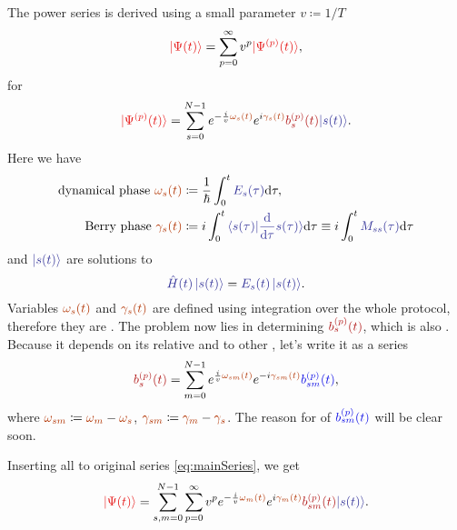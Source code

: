 The power series is derived using a small parameter $v\coloneqq 1/T$
\begin{equation}
    \red{\ket{\Psi(t)}}=\sum_{p=0}^\infty v^p \red{\ket{\Psi^{(p)}(t)}},
    \label{eq:mainSeries}
\end{equation}
for 
\begin{equation}
    \red{\ket{\Psi^{(p)}(t)}}=\sum_{s=0}^{N-1} e^{-\frac{i}{v} \reddd{\omega_s(t)}}e^{i\reddd{\gamma_s(t)}}\redd{b_s^{(p)}(t)}\bluee{\ket{s(t)}}.
\end{equation}
Here we have
\begin{align}
    \text{dynamical phase }\reddd{\omega_s(t)} &\coloneqq \frac{1}{\hbar}\int_0^t \bluee{E_s(\tau)}\d \tau,\\
    \text{Berry phase }\reddd{\gamma_s(t)} &\coloneqq i\int_0^t \bluee{\braket{s(\tau)|\frac{\d}{\d \tau}s(\tau)}}\d \tau \equiv i\int_0^t \bluee{M_{ss}(\tau)}\d \tau
    \label{eq:gammadef}
\end{align}
and $\bluee{\ket{s(t)}}$ are solutions to
\begin{equation}
    \bluee{\HH(t)\ket{s(t)}}=\bluee{E_s(t) \ket{s(t)}}.
\end{equation}
Variables $\reddd{\omega_s(t)}$ and $\reddd{\gamma_s(t)}$ are defined using integration over the whole protocol, therefore they are \emph{}.
The problem now lies in determining $\redd{b_s^{(p)}(t)}$, which is also . Because it depends on its relative  and  to other , let's write it as a series
\begin{equation}
    \redd{b_s^{(p)}(t)}=\sum_{m=0}^{N-1} e^{\frac{i}{v}\reddd{\omega_{sm}(t)}}e^{-i\reddd{\gamma_{sm}(t)}}\blue{b_{sm}^{(p)}(t)},
    \label{eq:bnAPT}
\end{equation}
where $\reddd{\omega_{sm}} \coloneqq \reddd{\omega_m}-\reddd{\omega_s}$, $\reddd{\gamma_{sm}} \coloneqq \reddd{\gamma_m}-\reddd{\gamma_s}$.  The reason for  of $\blue{b_{sm}^{(p)}(t)}$ will be clear soon.

Inserting all to original series \ref{eq:mainSeries}, we get
\begin{equation}
    \red{\ket{\Psi(t)}}=\sum_{s,m=0}^{N-1}\sum_{p=0}^\infty v^p e^{-\frac{i}{v}\reddd{\omega_m(t)}}e^{i\reddd{\gamma_m(t)}}\redd{b_{sm}^{(p)}(t)}\bluee{\ket{s(t)}}.
    \label{eq:solve0}
\end{equation}

